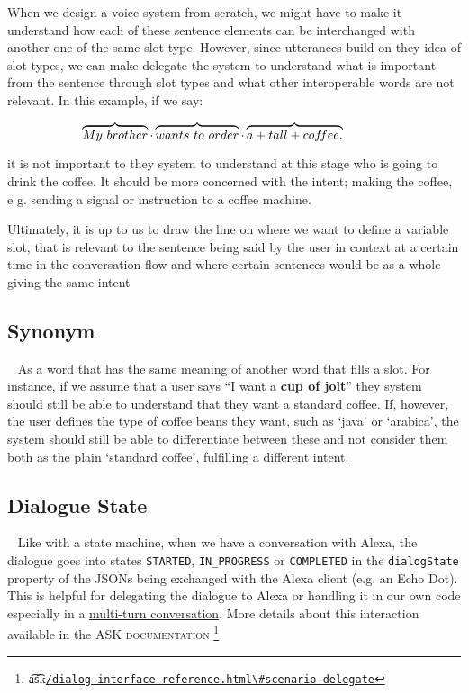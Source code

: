 	When we design a voice system from scratch, we might have to make it understand how each of these sentence elements can be interchanged with another one of the same slot type. However, since utterances build on they idea of slot types, we can make delegate the system to understand what is important from the sentence through slot types and what other interoperable words are not relevant. In this example, if we say:
	
	\[
	\overbrace{My \ brother} \cdot
	\overbrace{wants \ to \ order} \cdot
	\overbrace{ a + tall + cof\mkern-3mu fee.}
	\ \ \ \ \ \ \ \ \ \ 
	\]
	

	it is not important to they system to understand at this stage who is going to drink the coffee. It should be more concerned with the intent; making the coffee, e g. sending a signal or instruction to a coffee machine.
	 
	Ultimately, it is up to us to draw the line on where we want to define a variable slot, that is relevant to the sentence being said by the user in context at a certain time in the conversation flow and where certain sentences would be as a whole giving the same intent
	
	
	\subsection*{Synonym}~\label{synonym:def}
	As a word that has the same meaning of another word that fills a slot. For instance, if we assume that a user says ``I want a \textbf{cup of jolt}'' they system should still be able to understand that they want a standard coffee. If, however, the user defines the type of coffee beans they want, such as `java' or `arabica', the system should still be able to differentiate between these and not consider them both as the plain `standard coffee', fulfilling a different intent. 
	
	\subsection*{Dialogue State}~\label{dialogState}
	Like with a state machine, when we have a conversation with Alexa, the dialogue goes into states \texttt{STARTED}, \texttt{IN_PROGRESS} or \texttt{COMPLETED} in the \texttt{dialogState} property of the JSONs being exchanged with the Alexa client (e.g. an Echo Dot). This is helpful for delegating the dialogue to Alexa or handling it in our own code especially in a \hyperlink{multiturn:def}{multi-turn conversation}. More details about this interaction available in the \textsc{ASK documentation} \footnote{\t{a\t{sk}}\href{https://developer.amazon.com/docs/custom-skills/dialog-interface-reference.html\#scenario-delegate}{\lstinline|/dialog-interface-reference.html\#scenario-delegate|}}
	
